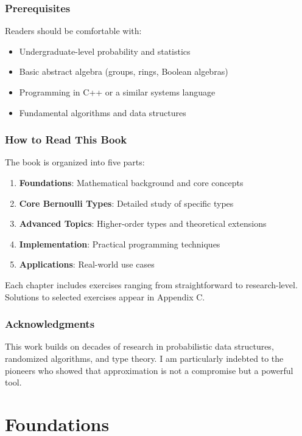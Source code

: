 \documentclass[11pt,twoside,openright]{book}
\theoremstyle{definition}
\theoremstyle{plain}
\theoremstyle{remark}
\begin{document}
\section*{Prerequisites}

Readers should be comfortable with:
\begin{itemize}
    \item Undergraduate-level probability and statistics
    \item Basic abstract algebra (groups, rings, Boolean algebras)
    \item Programming in C++ or a similar systems language
    \item Fundamental algorithms and data structures
\end{itemize}

\section*{How to Read This Book}

The book is organized into five parts:
\begin{enumerate}
    \item \textbf{Foundations}: Mathematical background and core concepts
    \item \textbf{Core Bernoulli Types}: Detailed study of specific types
    \item \textbf{Advanced Topics}: Higher-order types and theoretical extensions
    \item \textbf{Implementation}: Practical programming techniques
    \item \textbf{Applications}: Real-world use cases
\end{enumerate}

Each chapter includes exercises ranging from straightforward to research-level. Solutions to selected exercises appear in Appendix C.

\section*{Acknowledgments}

This work builds on decades of research in probabilistic data structures, randomized algorithms, and type theory. I am particularly indebted to the pioneers who showed that approximation is not a compromise but a powerful tool.

\mainmatter

\part{Foundations}
\end{document}
